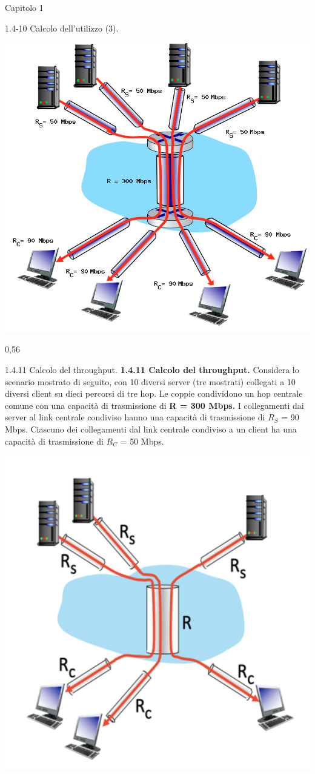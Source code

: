 \documentclass[a4paper]{article}
\begin{document}
\begin{quiz}{Capitolo 1}
\begin{shortanswer}[points=1,shuffle=true]{1.4-10 Calcolo dell'utilizzo (3).}
\begin{center}
\includegraphics[width=0.7\linewidth]{figs/1.4.7.png}
\end{center}
\item 0,56
\end{shortanswer}

\begin{multi}[points=1,shuffle=true]{1.4.11 Calcolo del throughput.}
\textbf{1.4.11 Calcolo del throughput.}
Considera lo scenario mostrato di seguito, con 10 diversi server (tre mostrati) collegati a 10 diversi client su dieci percorsi di tre hop. Le coppie condividono un hop centrale comune con una capacità di trasmissione di \textbf{R = 300 Mbps.} I collegamenti dai server al link centrale condiviso hanno una capacità di trasmissione di $R_S$ = 90 Mbps. Ciascuno dei collegamenti dal link centrale condiviso a un client ha una capacità di trasmissione di $R_C$ = 50 Mbps.
\begin{center}
\includegraphics[width=0.7\linewidth]{figs/1.4.11.png}
\end{center}


\end{multi}
\end{quiz}
\end{document}
